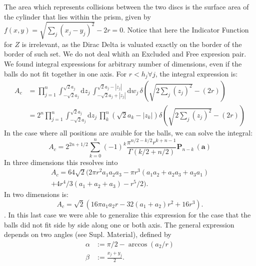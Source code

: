 \documentclass[superscriptaddress,pre,reprint,showpacs,twocolumn]{revtex4-1}
\newcommand{\rd}[1]{\mathrm{d}{#1} \,}
\newcommand{\sumprod}[1]{\mathbf{P}_{#1} \,}
\begin{document}
The area which represents collisions between the two discs is the surface area of the cylinder
that lies within the prism, given by
$f(x,y) = \sqrt{\sum_j (x_j-y_j)^2} -2r=0$.
Notice that here the Indicator Function for $Z$ is irrelevant, as
the Dirac Delta is valuated exactly on the border of the border
of such set. We do not deal whith an Excluded and Free expresion pair.
 We found integral expressions for
arbitrary number of dimensions, even if the balls do not fit
together in one axis.
For $r<h_j \forall j$, the integral expression is:
\begin{equation}
  \begin{split}
  A_{c} & =  \prod_{j=1}^n\int_{-\sqrt{2}a_j}^{\sqrt{2}a_j} \rd{z_j}
  \int_{-\sqrt{2}a_j+|z_j|}^{\sqrt{2}a_j-|z_j|} \rd{w_j}
  \delta (\sqrt{2 \sum_j (z_j)^2} - (2r)) \\
  & = 2^n \prod_{j=1}^n\int_{-\sqrt{2}a_j}^{\sqrt{2}a_j} \rd{z_j}
  \prod_k^n(\sqrt{2} a_k -|z_k|)
  \delta (\sqrt{2 \sum_j (z_j)^2} - (2r))
  \end{split}
\end{equation}
In the case where all positions are avaible for the balls, we can solve
the integral:
\begin{equation}
  A_{c}=  2^{2n+1/2} \sum_{k=0}^{n} (-1)^k
  \frac{\pi^{n/2-k/2} r^{k+n-1}}{\Gamma(k/2+n/2)}
  \sumprod{n-k}(\mathbf{a}) 
\end{equation}
In three dimensions
this resolves into
\begin{equation}
   \begin{split}
     A_{c}=64 \sqrt{2} \big( 2 \pi r^2 a_1a_2a_3 
      -\pi r^3 (a_1a_2 +a_2a_3 + a_3 a_1) \\
  +4r^4/3 (a_1+a_2+a_3)
  -r^5/2 \big).
  \end{split}
\end{equation}
In two dimensions is:
\begin{equation}\label{AreaChoque}
A_{c}  =  \sqrt{2} (
16\pi a_1 a_2 r -32 (a_1+a_2)r^2 +16 r^3).
\end{equation}.
In this last case we were able to generalize this expression for
the case that the balls did not fit side by side along one or both
axis. The general expression depends on two angles
(see Supl. Material), defined by
\begin{equation}\label{angulos2d}
 \begin{aligned}
\alpha & :=\pi/2 - \arccos(a_2/r) \\
\beta & := \frac{x_j +y_j}{2} .\\
  \end{aligned}
\end{equation}
\end{document}
